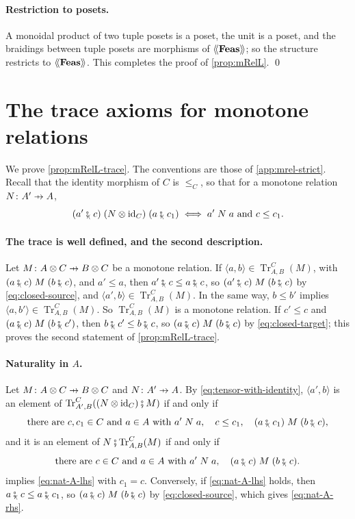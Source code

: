 \documentclass[11pt,a4paper]{article}
\theoremstyle{plain}
\theoremstyle{definition}
\theoremstyle{remark}
\newcommand{\Cat}[1]{\mathbf{#1}}
\newcommand{\Feas}{\Cat{Feas}}
\providecommand{\llangle}{\mathopen{\langle\mkern-3.5mu\langle}}
\providecommand{\rrangle}{\mathclose{\rangle\mkern-3.5mu\rangle}}
\newcommand{\tL}[1]{\llangle #1 \rrangle}
\newcommand{\then}{\mathbin{\fatsemi}}
\newcommand{\tc}{\mathbin{\fatsemi_{\!\scriptscriptstyle\langle}}}
\newcommand{\tup}[1]{\langle #1 \rangle}
\newcommand{\profto}{\mathrel{\ooalign{\hfil$\mapstochar\mkern 5mu$\hfil\cr$\to$\cr}}}
\newcommand{\rel}[3]{#1 \mathrel{#2} #3}
\DeclareMathOperator{\Tr}{Tr}
\newcommand{\id}{\mathrm{id}}
\begin{document}
\paragraph{Restriction to posets.}
A monoidal product of two tuple posets is a poset, the unit is a poset, and the braidings between tuple posets are morphisms of $\tL{\Feas}$; so the structure restricts to $\tL{\Feas}$.
This completes the proof of \cref{prop:mRelL}. \qed

\section{The trace axioms for monotone relations}
\label{app:mrel-trace}

We prove \cref{prop:mRelL-trace}.
The conventions are those of \cref{app:mrel-strict}.
Recall that the identity morphism of $C$ is $\leq_C$, so that for a monotone relation $N \colon A' \profto A$,
\begin{equation}
    \label{eq:tensor-with-identity}
    \rel{(a' \tc c)}{(N \otimes \id_C)}{(a \tc c_1)} \iff \rel{a'}{N}{a} \text{ and } c \leq c_1.
\end{equation}

\paragraph{The trace is well defined, and the second description.}
Let $M \colon A \otimes C \profto B \otimes C$ be a monotone relation.
If $\tup{a,b} \in \Tr^{C}_{A,B}(M)$, with $\rel{(a \tc c)}{M}{(b \tc c)}$, and $a' \leq a$, then $a' \tc c \leq a \tc c$, so $\rel{(a' \tc c)}{M}{(b \tc c)}$ by \cref{eq:closed-source}, and $\tup{a',b} \in \Tr^{C}_{A,B}(M)$.
In the same way, $b \leq b'$ implies $\tup{a,b'} \in \Tr^{C}_{A,B}(M)$.
So $\Tr^{C}_{A,B}(M)$ is a monotone relation.
If $c' \leq c$ and $\rel{(a \tc c)}{M}{(b \tc c')}$, then $b \tc c' \leq b \tc c$, so $\rel{(a \tc c)}{M}{(b \tc c)}$ by \cref{eq:closed-target}; this proves the second statement of \cref{prop:mRelL-trace}.

\paragraph{Naturality in $A$.}
Let $M \colon A \otimes C \profto B \otimes C$ and $N \colon A' \profto A$.
By \cref{eq:tensor-with-identity}, $\tup{a', b}$ is an element of $\Tr^{C}_{A',B}((N \otimes \id_C) \then M)$ if and only if
\begin{equation}
    \label{eq:nat-A-lhs}
    \text{there are } c, c_1 \in C \text{ and } a \in A \text{ with } \rel{a'}{N}{a},\quad c \leq c_1, \quad \rel{(a \tc c_1)}{M}{(b \tc c)},
\end{equation}
and it is an element of $N \then \Tr^{C}_{A,B}(M)$ if and only if
\begin{equation}
    \label{eq:nat-A-rhs}
    \text{there are } c \in C \text{ and } a \in A \text{ with } \rel{a'}{N}{a}, \quad \rel{(a \tc c)}{M}{(b \tc c)}.
\end{equation}
 implies \cref{eq:nat-A-lhs} with $c_1 = c$.
Conversely, if \cref{eq:nat-A-lhs} holds, then $a \tc c \leq a \tc c_1$, so $\rel{(a \tc c)}{M}{(b \tc c)}$ by \cref{eq:closed-source}, which gives \cref{eq:nat-A-rhs}.
\end{document}
